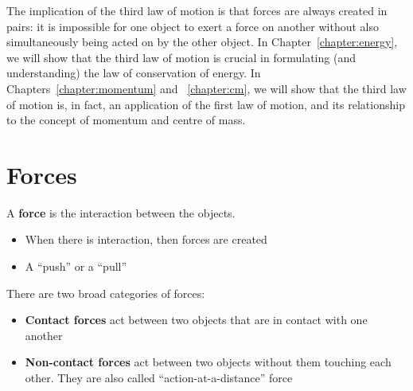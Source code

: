 The implication of the third law of motion is that forces are always created in
pairs: it is impossible for one object to exert a force on another without also
simultaneously being acted on by the other object. In
Chapter~\ref{chapter:energy}, we will show that the third law of motion is
crucial in formulating (and understanding) the law of conservation of energy.
In Chapters~\ref{chapter:momentum} and ~\ref{chapter:cm}, we will show that the
third law of motion is, in fact, an application of the first law of motion,
and its relationship to the concept of momentum and centre of mass.



\section{Forces}
A \textbf{force} is the interaction between the objects.
\begin{itemize}
\item When there is interaction, then forces are created
\item A ``push'' or a ``pull''
\end{itemize}
There are two broad categories of forces:
\begin{itemize}
\item\textbf{Contact forces} act between two objects that are in contact
  with one another
\item\textbf{Non-contact forces} act between two objects without them
  touching each other. They are also called ``action-at-a-distance'' force
\end{itemize}



